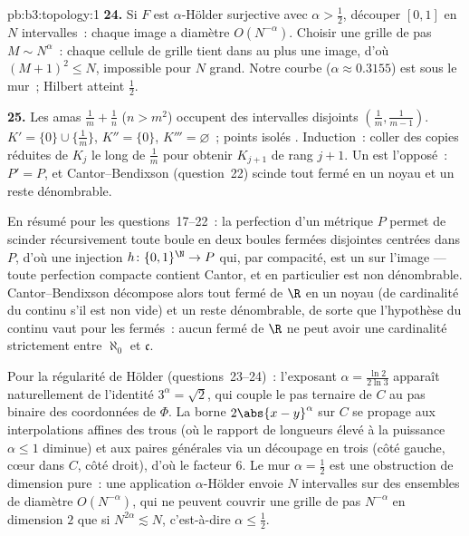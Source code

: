 \begin{solution}{pb:b3:topology:1}
\textbf{24.} Si $F$ est $\alpha$-Hölder surjective avec
$\alpha > \frac12$, découper $[0,1]$ en $N$ intervalles~:
chaque image a diamètre $O(N^{-\alpha})$. Choisir une grille
de pas $M \sim N^\alpha$~: chaque cellule de grille tient
dans au plus une image, d'où $(M+1)^2 \leq N$, impossible
pour $N$ grand. Notre courbe ($\alpha \approx 0.3155$) est
sous le mur~; Hilbert atteint $\frac12$.

\textbf{25.} Les amas $\frac1m + \frac1n$ ($n > m^2$)
occupent des intervalles disjoints $(\frac1m,
\frac1{m-1})$. $K' = \{0\} \cup \{\frac1m\}$, $K'' =
\{0\}$, $K''' = \varnothing$~; points isolés .
Induction~: coller des copies réduites de $K_j$ le long de
$\frac1m$ pour obtenir $K_{j+1}$ de rang $j+1$. Un 
est l'opposé~: $P' = P$, et Cantor--Bendixson (question~22)
scinde tout fermé en un noyau  et un reste
dénombrable.


En résumé pour les questions~17--22~: la perfection d'un
 métrique $P$ permet de scinder récursivement toute
boule en deux boules fermées disjointes centrées dans $P$,
d'où une injection  $h \colon \{0,1\}^\N \to P$
qui, par compacité, est un  sur l'image ---
toute perfection compacte contient Cantor, et en particulier
est non dénombrable. Cantor--Bendixson décompose alors tout
fermé de $\R$ en un noyau  (de cardinalité du
continu s'il est non vide) et un reste dénombrable, de sorte
que l'hypothèse du continu vaut pour les fermés~: aucun
fermé de $\R$ ne peut avoir une cardinalité strictement
entre $\aleph_0$ et $\mathfrak c$.

Pour la régularité de Hölder (questions~23--24)~: l'exposant
$\alpha = \frac{\ln 2}{2\ln 3}$ apparaît naturellement de
l'identité $3^\alpha = \sqrt2$, qui couple le pas ternaire
de $C$ au pas binaire des coordonnées de $\Phi$. La borne
$2\abs{x-y}^\alpha$ sur $C$ se propage aux interpolations
affines des trous (où le rapport de longueurs élevé à la
puissance $\alpha \leq 1$ diminue) et aux paires générales
via un découpage en trois (côté gauche, cœur dans $C$, côté
droit), d'où le facteur $6$. Le mur $\alpha = \frac12$ est
une obstruction de dimension pure~: une application
$\alpha$-Hölder envoie $N$ intervalles sur des ensembles de
diamètre $O(N^{-\alpha})$, qui ne peuvent couvrir une grille
de pas $N^{-\alpha}$ en dimension $2$ que si $N^{2\alpha}
\lesssim N$, c'est-à-dire $\alpha \leq \frac12$.



\end{solution}
